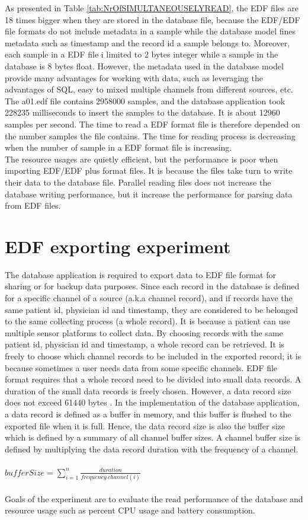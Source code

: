 As presented in Table \ref{tab:NrOfSIMULTANEOUSELYREAD}, the EDF files are 18 times bigger when they are stored in the database file, because the EDF/EDF file formats do not include metadata in a sample while the database model fines metadata such as timestamp and the record id a sample belongs to. Moreover, each sample in a EDF file i limited to 2 bytes integer while a sample in the database is 8 bytes float. However, the metadata used in the database model provide many advantages for working with data, such as leveraging the advantages of SQL, easy to mixed multiple channels from different sources, etc.\\
The a01.edf file contains 2958000 samples, and the database application took 228235 milliseconds to insert the samples to the database. It is about 12960 samples per second. The time to read a EDF format file is therefore depended on the number samples the file contains. The time for reading process is decreasing when the number of sample in a EDF format file is increasing.\\
The resource usages are quietly efficient, but the performance is poor when importing EDF/EDF plus format files. It is because the files take turn to write their data to the database file. Parallel reading files does not increase the database writing performance, but it increase the performance for parsing data from EDF files.
\section{EDF exporting experiment}
The database application is required to export data to EDF file format for sharing or for backup data purposes. Since each record in the database is defined for a specific channel of a source (a.k.a channel record), and if records have the same patient id, physician id and timestamp, they are considered to be belonged to the same collecting process (a whole record). It is because a patient can use multiple sensor platforms to collect data. By choosing records with the same patient id, physician id and timestamp, a whole record can be retrieved. It is freely to choose which channel records to be included in the exported record; it is because sometimes a user needs data from some specific channels. EDF file format requires that a whole record need to be divided into small data records. A duration of the small data records is freely chosen. However, a data record size does not exceed 61440 bytes \citep{EDFpluss}. In the implementation of the database application, a data record is defined as a buffer in memory, and this buffer is flushed to the exported file when it is full. Hence, the data record size is also the buffer size which is defined by a summary of all channel buffer sizes. A channel buffer size is defined by multiplying the data record duration with the frequency of a channel.\\\\
$bufferSize=\sum_{i = 1}^{n}\frac{duration}{frequency\ channel(i)}$\\\\
Goals of the experiment are to evaluate the read performance of the database and resource usage such as percent CPU usage and battery consumption.
